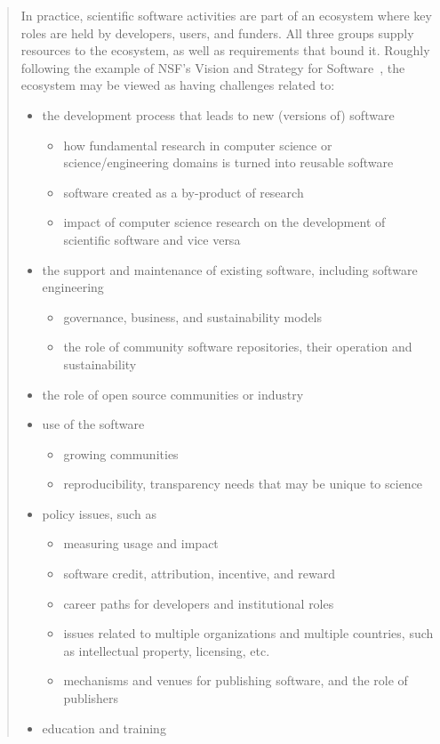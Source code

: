 \documentclass[11pt, oneside]{amsart}
\begin{document}
\begin{quote}
In practice, scientific software activities are part of an ecosystem
where key roles are held by developers, users, and funders. All three
groups supply resources to the ecosystem, as well as requirements that
bound it. Roughly following the example of NSF's Vision and Strategy
for Software~\cite{NSF_software_vision},
the ecosystem may be viewed as having challenges related to:

\begin{itemize}[leftmargin=0.2in]
\item the development process that leads to new (versions of) software
\begin{itemize}[leftmargin=0.2in]
\item how fundamental research in computer science or
  science/engineering domains is turned into reusable software
\item software created as a by-product of research
\item impact of computer science research on the development of
    scientific software and vice versa
\end{itemize}
\item the support and maintenance of existing software, including
  software engineering
\begin{itemize}[leftmargin=0.2in]
\item governance, business, and sustainability models
\item the role of community software repositories, their operation and
  sustainability
\end{itemize}
\item the role of open source communities or industry
\item use of the software
\begin{itemize}[leftmargin=0.2in]
\item growing communities
\item reproducibility, transparency needs that may be unique to science
\end{itemize}
\item policy issues, such as
\begin{itemize}[leftmargin=0.2in]
\item measuring usage and impact
\item software credit, attribution, incentive, and reward
\item career paths for developers and institutional roles
\item issues related to multiple organizations and multiple countries,
  such as intellectual property, licensing, etc.
\item mechanisms and venues for publishing software, and the role of
  publishers
\end{itemize}
\item education and training
\end{itemize}

\end{quote}
\end{document}
